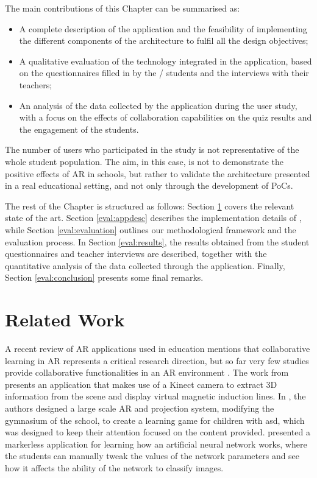 The main contributions of this Chapter can be summarised as:
\begin{itemize}
    \item A complete description of the application and the feasibility of implementing the different components of the \arch{} architecture to fulfil all the design objectives;
    \item A qualitative evaluation of the technology integrated in the application, based on the questionnaires filled in by the \numstudents/ students and the interviews with their teachers;
    \item An analysis of the data collected by the application during the user study, with a focus on the effects of collaboration capabilities on the quiz results and the engagement of the students.
\end{itemize}

The number of users who participated in the study is not representative of the whole student population. The aim, in this case, is not to demonstrate the positive effects of AR in schools, but rather to validate the architecture presented in a real educational setting, and not only through the development of PoCs.

The rest of the Chapter is structured as follows: Section \ref{eval:related} covers the relevant state of the art.
Section \ref{eval:appdesc} describes the implementation details of \appname{}, while Section \ref{eval:evaluation} outlines our methodological framework and the evaluation process.
In Section \ref{eval:results}, the results obtained from the student questionnaires and teacher interviews are described, together with the quantitative analysis of the data collected through the application.
Finally, Section \ref{eval:conclusion} presents some final remarks. 

\section{Related Work}\label{eval:related}

A recent review of AR applications used in education \citep{eleniiattro} mentions that collaborative learning in AR represents a critical research direction, but so far very few studies provide collaborative functionalities in an AR environment \citep{9645428, choi2017arclassnote}.
The work from \cite{cai2017applications} presents an application that makes use of a Kinect camera to extract 3D information from the scene and display virtual magnetic induction lines.
In \citep{takahashi2018empathic}, the authors designed a large scale AR and projection system, modifying the gymnasium of the school, to create a learning game for children with \gls{asd}, which was designed to keep their attention focused on the content provided.
\cite{laviole2018nectar} presented a markerless application for learning how an artificial neural network works, where the students can manually tweak the values of the network parameters and see how it affects the ability of the network to classify images.

